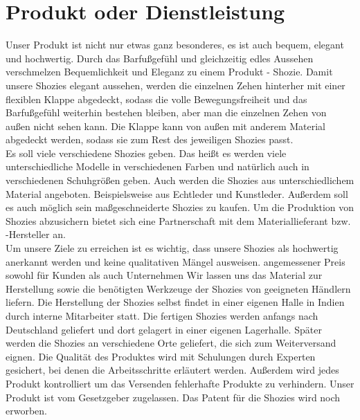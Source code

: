 \chapter{Produkt oder Dienstleistung}
\label{cha:3}
Unser Produkt ist nicht nur etwas ganz besonderes, es ist auch bequem, elegant und hochwertig.
Durch das Barfußgefühl und gleichzeitig edles Aussehen verschmelzen Bequemlichkeit und Eleganz zu einem Produkt - Shozie.
Damit unsere Shozies elegant aussehen, werden die einzelnen Zehen hinterher mit einer flexiblen Klappe abgedeckt, sodass die volle Bewegungsfreiheit und das Barfußgefühl weiterhin bestehen bleiben, aber man die einzelnen Zehen von außen nicht sehen kann.
Die Klappe kann von außen mit anderem Material abgedeckt werden, sodass sie zum Rest des jeweiligen Shozies passt.\\
Es soll viele verschiedene Shozies geben. Das heißt es werden viele unterschiedliche Modelle in verschiedenen Farben und natürlich auch in verschiedenen Schuhgrößen geben. Auch werden die Shozies aus unterschiedlichem Material angeboten. Beispielsweise aus Echtleder und Kunstleder. Außerdem soll es auch möglich sein maßgeschneiderte Shozies zu kaufen.
Um die Produktion von Shozies abzusichern bietet sich eine Partnerschaft mit dem Materiallieferant bzw. -Hersteller an.\\
Um unsere Ziele zu erreichen ist es wichtig, dass unsere Shozies als hochwertig anerkannt werden und keine qualitativen Mängel ausweisen.
angemessener Preis sowohl für Kunden als auch Unternehmen
Wir lassen uns das Material zur Herstellung sowie die benötigten Werkzeuge der Shozies von geeigneten Händlern liefern.
Die Herstellung der Shozies selbst findet in einer eigenen Halle in Indien durch interne Mitarbeiter statt.
Die fertigen Shozies werden anfangs nach Deutschland geliefert und dort gelagert in einer eigenen Lagerhalle. Später werden die Shozies an verschiedene Orte geliefert, die sich zum Weiterversand eignen.
Die Qualität des Produktes wird mit Schulungen durch Experten gesichert, bei denen die Arbeitsschritte erläutert werden. Außerdem wird jedes Produkt kontrolliert um das Versenden fehlerhafte Produkte zu verhindern.
Unser Produkt ist vom Gesetzgeber zugelassen. Das Patent für die Shozies wird noch erworben.\\

